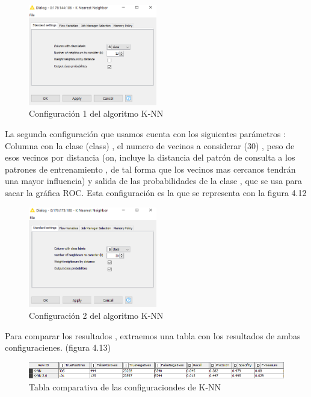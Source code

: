 	\begin{figure}[htb]
		\centering
		\includegraphics[width=0.5\textwidth]{./imagenes/50}
		\caption{Configuración 1 del algoritmo K-NN} \label{fig:1}
	\end{figure}
	
	La segunda configuración que usamos cuenta con los siguientes parámetros : Columna con la clase (class) , el numero de vecinos a considerar (30) , peso de esos vecinos por distancia (on, incluye la distancia del patrón de consulta a los patrones de entrenamiento , de tal forma que los vecinos mas cercanos tendrán una mayor influencia) y salida de las probabilidades de la clase , que se usa para sacar la gráfica ROC. Esta configuración es la que se representa con la figura 4.12
	
	\begin{figure}[htb]
		\centering
		\includegraphics[width=0.5\textwidth]{./imagenes/51}
		\caption{Configuración 2 del algoritmo K-NN} \label{fig:1}
	\end{figure}
		
	Para comparar los resultados , extraemos una tabla con los resultados de ambas configuracienes. (figura 4.13)
	
	\begin{figure}[htb]
		\centering
		\includegraphics[width=1.0\textwidth]{./imagenes/52}
		\caption{Tabla comparativa de las configuraciondes de K-NN} \label{fig:1}
	\end{figure}
	
